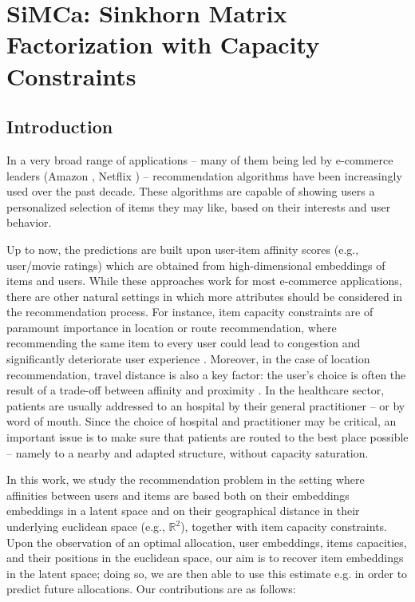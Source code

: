 \chapter{SiMCa: Sinkhorn Matrix Factorization with Capacity Constraints}

\section{Introduction}

In a very broad range of applications -- many of them being led by e-commerce leaders (Amazon \cite{linden_amazoncom_2003}, Netflix \cite{koren_matrix_2009}) -- recommendation algorithms have been increasingly used over the past decade. These algorithms are capable of showing users a personalized selection of items they may like, based on their interests and user behavior.

Up to now, the predictions are built upon user-item affinity scores (e.g., user/movie ratings) which are obtained from high-dimensional embeddings of items and users. While these approaches work for most e-commerce applications, there are other natural settings in which more attributes should be considered in the recommendation process. For instance, item capacity constraints are of paramount importance in location or route recommendation, where recommending the same item to every user could lead to congestion and significantly deteriorate  user experience \cite{christakopoulou_recommendation_2017}. Moreover, in the case of location recommendation, travel distance is also a key factor: the user's choice is often the result of a trade-off between affinity and proximity \cite{zhao_survey_2016}. In the healthcare sector, patients are usually addressed to an hospital by their general practitioner -- or by word of mouth. Since the choice of hospital and practitioner may be critical, an important issue is to make sure that patients are routed to the best place possible -- namely to a nearby and adapted structure, without capacity saturation.

In this work, we study the recommendation problem in the setting where affinities between users and items are based both on their embeddings embeddings in a latent space and on their geographical distance in their underlying euclidean space (e.g., $\mathbb{R}^2$), together with item capacity constraints.  Upon the observation of an optimal allocation, user embeddings, items capacities, and their positions in the euclidean space, our aim is to recover item embeddings in the latent space; doing so, we are then able to use this estimate e.g. in order to predict future allocations. Our contributions are as follows:

